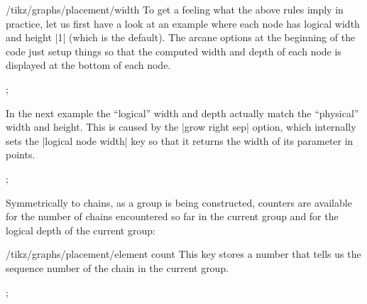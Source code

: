 \begin{key}{/tikz/graphs/placement/width}
    To get a feeling what the above rules imply in practice, let us first have
    a look at an example where each node has logical width and height |1|
    (which is the default). The arcane options at the beginning of the code
    just setup things so that the computed width and depth of each node is
    displayed at the bottom of each node.
\begin{codeexample}[]
\tikz
  ;
\end{codeexample}
    In the next example the ``logical'' width and depth actually match the
    ``physical'' width and height. This is caused by the |grow right sep|
    option, which internally sets the |logical node width| key so that it
    returns the width of its parameter in points.
\begin{codeexample}[]
\tikz
  ;
\end{codeexample}
\end{key}

Symmetrically to chains, as a group is being constructed, counters are
available for the number of chains encountered so far in the current group and
for the logical depth of the current group:
%
\begin{key}{/tikz/graphs/placement/element count}
    This key stores a number that tells us the sequence number of the
    chain in the current group.
\begin{codeexample}[]
\tikz {};
\end{codeexample}
\end{key}

